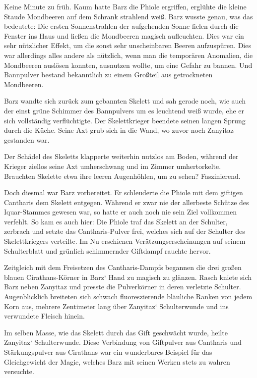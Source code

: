 Keine Minute zu früh. Kaum hatte Barz die Phiole ergriffen, erglühte die kleine Staude Mondbeeren auf dem Schrank strahlend weiß. Barz wusste genau, was das bedeutete: Die ersten Sonnenstrahlen der aufgehenden Sonne fielen durch die Fenster ins Haus und ließen die Mondbeeren magisch aufleuchten. Dies war ein sehr nützlicher Effekt, um die sonst sehr unscheinbaren Beeren aufzuspüren. Dies war allerdings alles andere als nützlich, wenn man die temporären Anomalien, die Mondbeeren auslösen konnten, ausnutzen wollte, um eine Gefahr zu bannen. Und Bannpulver bestand bekanntlich zu einem Großteil aus getrockneten Mondbeeren.

Barz wandte sich zurück zum gebannten Skelett und sah gerade noch, wie auch der einst grüne Schimmer des Bannpulvers um es leuchtend weiß wurde, ehe er sich vollständig verflüchtigte. Der Skelettkrieger beendete seinen langen Sprung durch die Küche. Seine Axt grub sich in die Wand, wo zuvor noch Zanyitaz gestanden war.

Der Schädel des Skeletts klapperte weiterhin nutzlos am Boden, während der Krieger ziellos seine Axt umherschwang und im Zimmer umhertorkelte. Brauchten Skelette etwa ihre leeren Augenhöhlen, um zu sehen? Faszinierend.

Doch diesmal war Barz vorbereitet. Er schleuderte die Phiole mit dem giftigen Cantharis dem Skelett entgegen. Während er zwar nie der allerbeste Schütze des Iquar-Stammes gewesen war, so hatte er auch noch nie sein Ziel vollkommen verfehlt. So kam es auch hier: Die Phiole traf das Skelett an der Schulter, zerbrach und setzte das Cantharis-Pulver frei, welches sich auf der Schulter des Skelettkriegers verteilte. Im Nu erschienen Verätzungserscheinungen auf seinem Schulterblatt und grünlich schimmernder Giftdampf rauchte hervor.

Zeitgleich mit dem Freisetzen des Cantharis-Dampfs begannen die drei großen blauen Cirathans-Körner in Barz‘ Hand zu magisch zu glänzen. Rasch kniete sich Barz neben Zanyitaz und presste die Pulverkörner in deren verletzte Schulter. Augenblicklich breiteten sich schwach fluoreszierende bläuliche Ranken von jedem Korn aus, mehrere Zentimeter lang über Zanyitaz‘ Schulterwunde und ins verwundete Fleisch hinein.

Im selben Masse, wie das Skelett durch das Gift geschwächt wurde, heilte Zanyitaz‘ Schulterwunde. Diese Verbindung von Giftpulver aus Cantharis und Stärkungspulver aus Cirathans war ein wunderbares Beispiel für das Gleichgewicht der Magie, welches Barz mit seinen Werken stets zu wahren versuchte.

